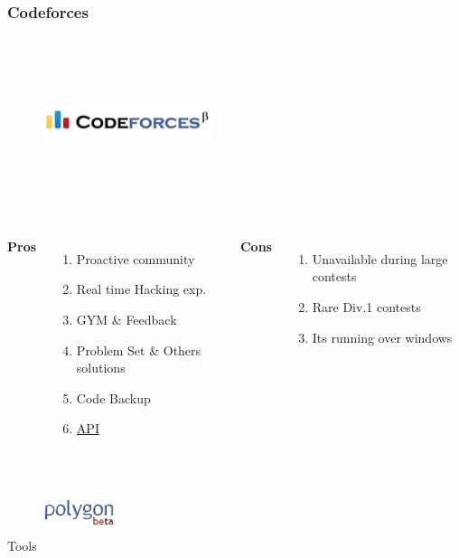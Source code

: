 \documentclass{beamer}
\begin{document}

\begin{frame}
	\frametitle{Codeforces}
	\begin{figure}[t]
		\href{http://codeforces.com/help}{\includegraphics[width=5cm,height=5cm,keepaspectratio]{images/judges/codeforces}}
	\end{figure}
	
	\begin{columns}[c] %
		\textbf{Pros}
		\begin{enumerate}
			\item Proactive community 
			\item Real time Hacking exp.
			\item GYM \& Feedback
			\item Problem Set \& Others solutions
			\item Code Backup 
			\item \href{http://codeforces.com/api/help}{API}
		\end{enumerate}
		\textbf{Cons}
		\begin{enumerate}
			\item Unavailable during large contests
			\item Rare Div.1 contests
			\item Its running over windows
		\end{enumerate}
	\end{columns}
	\begin{block}{Tools}
	\center
	\href{https://polygon.codeforces.com/} {\includegraphics[width=2.2cm,height=2.2cm,keepaspectratio]{images/tools/polygon}}
	\end{block}

\end{frame}
\end{document}
